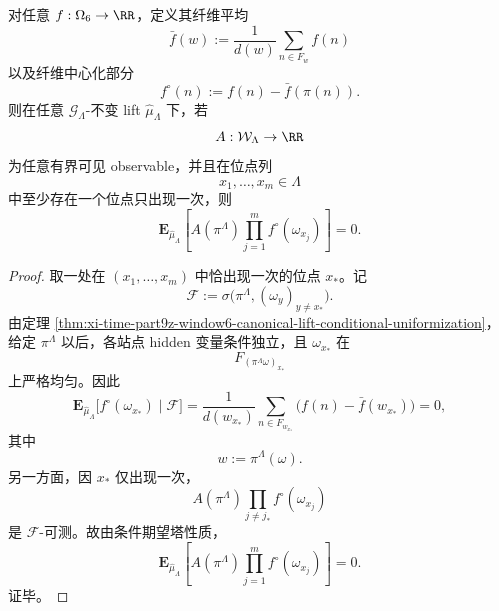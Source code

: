 \begin{theorem}[孤立站点湮没律]\label{thm:xi-time-part9z-window6-isolated-site-annihilation}
对任意 \(f:\Omega_6\to\RR\)，定义其纤维平均
\[
\bar f(w):=
\frac1{d(w)}\sum_{n\in F_w}f(n)
\]
以及纤维中心化部分
\[
f^\circ(n):=f(n)-\bar f(\pi(n)).
\]
则在任意 \(\mathcal G_\Lambda\)-不变 lift \(\widehat\mu_\Lambda\) 下，若
\[
A:\mathcal W_\Lambda\to \RR
\]
为任意有界可见 observable，并且在位点列
\[
x_1,\dots,x_m\in \Lambda
\]
中至少存在一个位点只出现一次，则
\[
\mathbf E_{\widehat\mu_\Lambda}\!\left[
A(\pi^\Lambda)\prod_{j=1}^m f^\circ(\omega_{x_j})
\right]=0.
\]
\end{theorem}
\begin{proof}
取一处在 \((x_1,\dots,x_m)\) 中恰出现一次的位点 \(x_\ast\)。记
\[
\mathcal F:=
\sigma\!\bigl(\pi^\Lambda,(\omega_y)_{y\neq x_\ast}\bigr).
\]
由定理 \ref{thm:xi-time-part9z-window6-canonical-lift-conditional-uniformization}，给定 \(\pi^\Lambda\) 以后，各站点 hidden 变量条件独立，且 \(\omega_{x_\ast}\) 在
\[
F_{(\pi^\Lambda\omega)_{x_\ast}}
\]
上严格均匀。因此
\[
\mathbf E_{\widehat\mu_\Lambda}\!\bigl[f^\circ(\omega_{x_\ast})\mid \mathcal F\bigr]
=
\frac1{d(w_{x_\ast})}\sum_{n\in F_{w_{x_\ast}}}
\bigl(f(n)-\bar f(w_{x_\ast})\bigr)
=0,
\]
其中
\[
w:=\pi^\Lambda(\omega).
\]
另一方面，因 \(x_\ast\) 仅出现一次，
\[
A(\pi^\Lambda)\prod_{j\ne j_\ast}f^\circ(\omega_{x_j})
\]
是 \(\mathcal F\)-可测。故由条件期望塔性质，
\[
\mathbf E_{\widehat\mu_\Lambda}\!\left[
A(\pi^\Lambda)\prod_{j=1}^m f^\circ(\omega_{x_j})
\right]
=0.
\]
证毕。
\end{proof}

